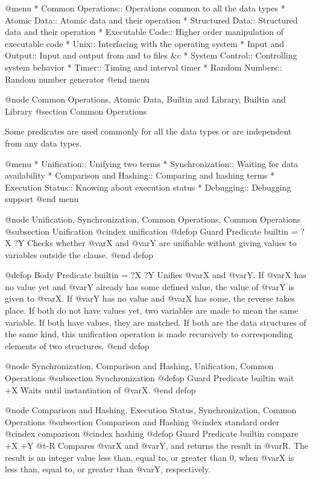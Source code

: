 {@menu
* Common Operations::           Operations common to all the data types
* Atomic Data::                 Atomic data and their operation
* Structured Data::             Structured data and their operation
* Executable Code::             Higher order manipulation of executable code
* Unix::                        Interfacing with the operating system
* Input and Output::            Input and output from and to files &c
* System Control::              Controlling system behavior
* Timer::                       Timing and interval timer
* Random Numbers::              Random number generator
@end menu

@node Common Operations, Atomic Data, Builtin and Library, Builtin and Library
@section Common Operations

Some predicates are used commonly for all the data types or are
independent from any data types.

@menu
* Unification::                 Unifying two terms
* Synchronization::             Waiting for data availability
* Comparison and Hashing::      Comparing and hashing terms
* Execution Status::            Knowing about execution status
* Debugging::                   Debugging support
@end menu

@node Unification, Synchronization, Common Operations, Common Operations
@subsection Unification
@cindex unification
@defop {Guard Predicate} {builtin} = ?X ?Y
Checks whether @var{X} and @var{Y} are unifiable without giving values
to variables outside the clause.
@end defop

@defop {Body Predicate} {builtin} = ?X ?Y
Unifies @var{X} and @var{Y}.  If @var{X} has no value yet and @var{Y}
already has some defined value, the value of @var{Y} is given to
@var{X}.  If @var{Y} has no value and @var{X} has some, the reverse
takes place.  If both do not have values yet, two variables are made to
mean the same variable.  If both have values, they are matched.  If both
are the data structures of the same kind, this unification operation is
made recursively to corresponding elements of two structures.
@end defop

@node Synchronization, Comparison and Hashing, Unification, Common Operations
@subsection Synchronization
@defop {Guard Predicate} {builtin} wait +X
Waits until instantiation of @var{X}.
@end defop

@node Comparison and Hashing, Execution Status, Synchronization, Common Operations
@subsection Comparison and Hashing
@cindex standard order
@cindex comparison
@cindex hashing
@defop {Guard Predicate} {builtin} compare +X +Y @t{-}R
Compares @var{X} and @var{Y}, and returns the result in @var{R}.  The
result is an integer value less than, equal to, or greater than 0,
when @var{X} is less than, equal to, or greater than @var{Y},
respectively.

}
